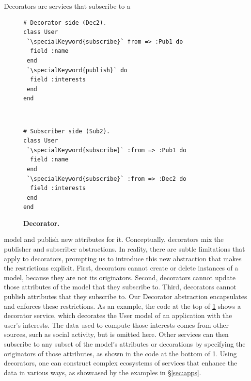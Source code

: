 Decorators are services that subscribe to a
\begin{figure}
\vspace{-0.2cm}
\begin{minipage}{.2\textwidth}
\begin{lstlisting}[xleftmargin=2pt,framexleftmargin=2pt]
# Decorator side (Dec2).
class User
 `\specialKeyword{subscribe}` from => :Pub1 do
  field :name
 end
 `\specialKeyword{publish}` do
  field :interests
 end
end
\end{lstlisting}
\end{minipage}\vspace{-9pt}\\
\noindent
\begin{minipage}{.2\textwidth}
\begin{lstlisting}[xleftmargin=2pt,framexleftmargin=2pt]
# Subscriber side (Sub2).
class User
 `\specialKeyword{subscribe}` :from => :Pub1 do
  field :name
 end
 `\specialKeyword{subscribe}` :from => :Dec2 do
  field :interests
 end
end
\end{lstlisting}
\end{minipage}
\vspace{-0.5cm}
\caption{{\footnotesize {\bf Decorator.}}}
\label{fig:deco}
\vspace{-10pt}
\end{figure}
\noindent
model and publish new attributes for it.  Conceptually, decorators mix the
publisher and subscriber abstractions.  In  reality, there are subtle
limitations that apply to decorators, prompting us to introduce this new
abstraction that makes the
restrictions explicit.  First, decorators cannot create or delete instances
of a model, because they are not its originators.  Second,
decorators cannot update those attributes of the model that they subscribe
to.  Third, decorators cannot publish attributes that they subscribe to.
Our Decorator abstraction encapsulates and enforces these restrictions.
As an example, the code at the top of \F\ref{fig:deco} shows a decorator
service, which decorates the User model of an application with the user's
interests.  The data used to compute those interests comes from other sources,
such as social activity, but is omitted here. Other services can then subscribe
to any subset of the model's attributes or decorations by specifying the
originators of those attributes, as shown in the code at the bottom of \F\ref{fig:deco}.
Using decorators, one can construct complex ecosystems of services
that enhance the data in various ways, as showcased by the examples in
\S\ref{sec:apps}.

